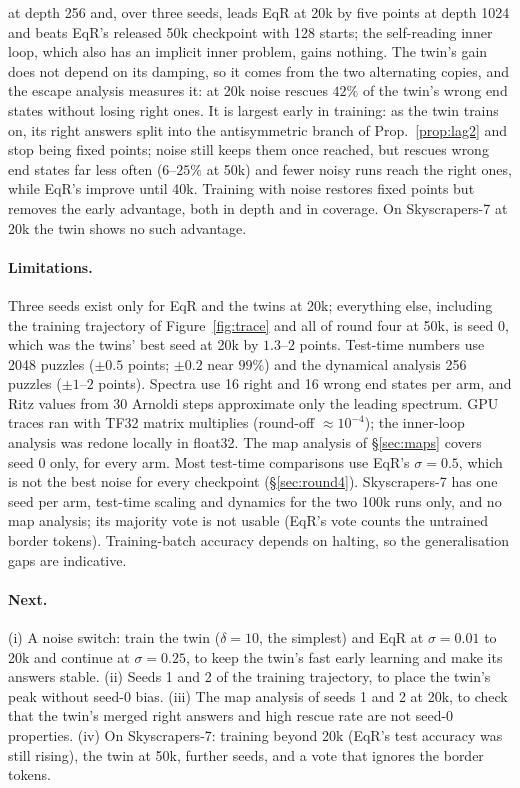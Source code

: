 \documentclass[11pt]{article}
\theoremstyle{definition}
\begin{document}
\begin{enumerate}[leftmargin=*,itemsep=1pt]
at depth 256 and, over three seeds, leads EqR at 20k by five points at depth 1024 and beats EqR's released 50k checkpoint with 128 starts; the
self-reading inner loop, which also has an implicit inner problem, gains nothing. The twin's gain does not depend on its damping, so it comes
from the two alternating copies, and the escape analysis measures it: at 20k noise rescues $42\%$ of the twin's wrong end states without
losing right ones. It is largest early in training: as the twin trains on, its right answers split into the antisymmetric branch of
Prop.~\ref{prop:lag2} and stop being fixed points; noise still keeps them once reached, but rescues wrong end states far less often ($6$--$25\%$
at 50k) and fewer noisy runs reach the right ones, while EqR's improve until 40k. Training with noise restores fixed points but removes the
early advantage, both in depth and in coverage. On Skyscrapers-7 at 20k the twin shows no such advantage.
\end{enumerate}

\paragraph{Limitations.} Three seeds exist only for EqR and the twins at 20k; everything else, including the training trajectory of
Figure~\ref{fig:trace} and all of round four at 50k, is seed 0, which was the twins' best seed at 20k by $1.3$--$2$ points. Test-time
numbers use 2048 puzzles ($\pm0.5$ points; $\pm0.2$ near $99\%$) and the dynamical analysis 256 puzzles ($\pm1$--$2$ points). Spectra use 16
right and 16 wrong end states per arm, and Ritz values from 30 Arnoldi steps approximate only the leading spectrum. GPU traces ran with TF32
matrix multiplies (round-off $\approx10^{-4}$); the inner-loop analysis was redone locally in float32. The map analysis of \S\ref{sec:maps}
covers seed 0 only, for every arm. Most test-time comparisons use EqR's $\sigma=0.5$, which is not the best
noise for every checkpoint (\S\ref{sec:round4}). Skyscrapers-7 has one seed per arm, test-time scaling and dynamics for the two 100k runs only,
and no map analysis; its majority vote is not usable (EqR's vote counts the untrained border tokens). Training-batch accuracy depends on halting,
so the generalisation gaps are indicative.

\paragraph{Next.} (i) A noise switch: train the twin ($\delta=10$, the simplest) and EqR at $\sigma=0.01$ to 20k and continue at $\sigma=0.25$,
to keep the twin's fast early learning and make its answers stable. (ii) Seeds 1 and 2 of the training trajectory, to place the twin's peak
without seed-0 bias. (iii) The map analysis of seeds 1 and 2 at 20k, to check that the twin's merged right answers and high rescue rate are
not seed-0 properties. (iv) On Skyscrapers-7: training beyond 20k (EqR's test accuracy was still rising), the twin at 50k, further seeds, and a
vote that ignores the border tokens.
\end{document}
